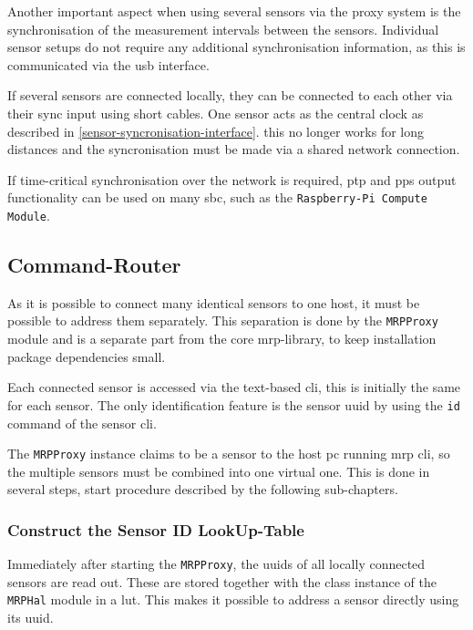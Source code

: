 Another important aspect when using several sensors via the proxy system
is the synchronisation of the measurement intervals between the sensors.
Individual sensor setups do not require any additional synchronisation
information, as this is communicated via the \gls{usb} interface.

If several sensors are connected locally, they can be connected to each
other via their sync input using short cables. One sensor acts as the
central clock as described in \ref{sensor-syncronisation-interface}.
this no longer works for long distances and the syncronisation must be
made via a shared network connection.

If time-critical synchronisation over the network is required, \gls{ptp}
and \gls{pps} output functionality \cite{PTPIEEE1588} can be used on
many \gls{sbc}, such as the
\passthrough{\lstinline!Raspberry-Pi Compute Module!}.

\hypertarget{command-router}{%
\subsection{Command-Router}\label{command-router}}

As it is possible to connect many identical sensors to one host, it must
be possible to address them separately. This separation is done by the
\passthrough{\lstinline!MRPProxy!} module and is a separate part from
the core \gls{mrp}-library, to keep installation package dependencies
small.

Each connected sensor is accessed via the text-based \gls{cli}, this is
initially the same for each sensor. The only identification feature is
the sensor \gls{uuid} by using the \passthrough{\lstinline!id!} command
of the sensor \gls{cli}.

The \passthrough{\lstinline!MRPProxy!} instance claims to be a sensor to
the host \gls{pc} running \gls{mrp} \gls{cli}, so the multiple sensors
must be combined into one virtual one. This is done in several steps,
start procedure described by the following sub-chapters.

\hypertarget{construct-the-sensor-id-lookup-table}{%
\subsubsection{Construct the Sensor ID
LookUp-Table}\label{construct-the-sensor-id-lookup-table}}

Immediately after starting the \passthrough{\lstinline!MRPProxy!}, the
\gls{uuid}s of all locally connected sensors are read out. These are
stored together with the class instance of the
\passthrough{\lstinline!MRPHal!} module in a \gls{lut}. This makes it
possible to address a sensor directly using its \gls{uuid}.

